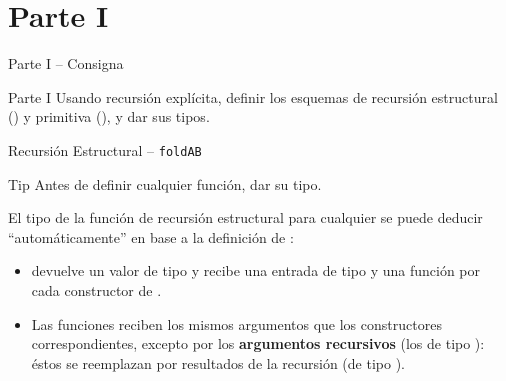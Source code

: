 \section{Parte I}

\begin{frame}{Parte I -- Consigna}
    \begin{exampleblock}{Parte I}
        Usando recursión explícita, definir los esquemas de recursión estructural () y primitiva (), y dar sus tipos.
    \end{exampleblock}    
\end{frame}

\begin{frame}{Recursión Estructural -- \texttt{foldAB}}
    \begin{block}{Tip}
        Antes de definir cualquier función, \alert{dar su tipo}.
    \end{block}

    \pause

    El tipo de la función de recursión estructural  para cualquier  se puede deducir ``automáticamente'' en base a la definición de :
    
    \pause

    \begin{itemize}[<+->]
        \item {} devuelve un valor de tipo  y recibe una entrada de tipo  y una función por cada constructor de .
        \item Las funciones reciben los mismos argumentos que los constructores correspondientes, excepto por los \textbf{argumentos recursivos} (los de tipo ): éstos se reemplazan por resultados de la recursión (de tipo ).
    \end{itemize}
\end{frame}

